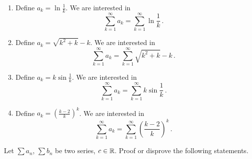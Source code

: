 \documentclass[week=5]{homework}
\begin{document}
\begin{questions}
\begin{enumerate}[label=(\alph*)]
	    	\item Define $a_k = \ln \frac{1}{k}$. We are interested in 
	    	\[
	    	\sum_{k=1}^{\infty} a_k = \sum_{k=1}^{\infty} \ln \frac{1}{k}\,.
	    	\] 
	    	
	    	\addtocounter{enumi}{1}
	    	\item Define $a_k = \sqrt{k^2 + k} -k$. We are interested in 
	    	\[
	    	\sum_{k=1}^{\infty} a_k = \sum_{k=1}^{\infty} \sqrt{k^2 + k} -k\,.
	    	\]
	    	
	    	\item Define $a_k = k \sin \frac{1}{k}$. We are interested in 
	    	\[
	    	\sum_{k=1}^{\infty} a_k = \sum_{k=1}^{\infty} k \sin \frac{1}{k}\,.
	    	\] 
	    	
	    	\addtocounter{enumi}{1}
	    	\item Define $a_k = \left(\frac{k-2}{k}\right)^k$. We are interested in 
	    	\[
	    	\sum_{k=1}^{\infty} a_k = \sum_{k=1}^{\infty} \left(\frac{k-2}{k}\right)^k\,.
	    	\]
	    \end{enumerate}
    
	    \question
	    Let $\sum a_n$, $\sum b_n$ be two series, $c\in\mathbb{R}$. Proof or disprove the following statements.
	    
\end{questions}
\end{document}
